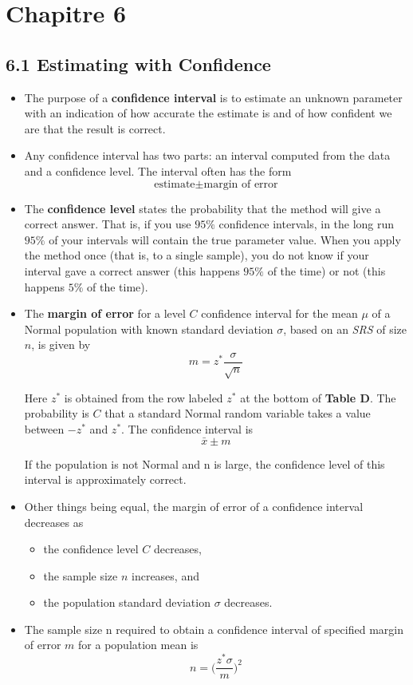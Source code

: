 \section{Chapitre 6}
	\subsection{6.1 Estimating with Confidence}
		\begin{itemize}
			\item The purpose of a \textbf{confidence interval} is to estimate an unknown parameter with an indication of how accurate the estimate is and of how confident we are that the result is correct.
			
			\item Any confidence interval has two parts: an interval computed from the data and a confidence level. The interval often has the form
				\[\text{estimate} \pm \text{margin of error}\]
			
			\item The \textbf{confidence level} states the probability that the method will give a correct answer. That is, if you use $95 \%$ confidence intervals, in the long run $95  \%$ of your intervals will contain the true parameter value. When you apply the method once (that is, to a single sample), you do not know if your interval gave a correct answer (this happens $95 \%$ of the time) or not (this happens $5 \%$ of the time).
					
			\item The \textbf{margin of error} for a level $C$ confidence interval for the mean $\mu$ of a Normal population with known standard deviation $\sigma$, based on an \textit{SRS} of size $n$, is given by \[m=z^{*}\frac{\sigma}{\sqrt{n}}\]
			
			Here $z^{*}$ is obtained from the row labeled $z^{*}$ at the bottom of \textbf{Table D}. The probability is $C$ that a standard Normal random variable takes a value between $-z^{*}$ and $z^{*}$. The confidence interval is \[\bar{x}\pm m\]
			
			If the population is not Normal and n is large, the confidence level of this interval is approximately correct.
			
			\item Other things being equal, the margin of error of a confidence interval decreases as
				\begin{itemize}
					\item the confidence level $C$ decreases,
					\item the sample size $n$ increases, and
					\item the population standard deviation $\sigma$ decreases.
				\end{itemize}
			\item The sample size n required to obtain a confidence interval of specified margin of error $m$ for a population mean is \[n=\bigg(\frac{z^{*}\sigma}{m}\bigg)^2\]
			

\end{itemize}
